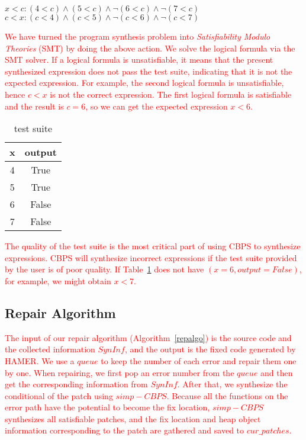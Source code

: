 \documentclass[a4paper,11pt,oneside,openany]{book}
\begin{document}
\begin{minipage}{\textwidth}
    \vspace{0.2cm}
    \textsl{\hspace{0.3cm}$x<c: (4<c)\wedge(5<c)\wedge\neg(6<c)\wedge\neg(7<c)$\\\hspace{0.3cm}$c<x: (c<4)\wedge(c<5)\wedge\neg(c<6)\wedge\neg(c<7)$\\}
\end{minipage}
\textcolor{red}{
We have turned the program synthesis problem into {\it Satisfiability Modulo Theories} (SMT) by doing the above action. We solve the logical formula via the SMT solver. If a logical formula is unsatisfiable, it means that the present synthesized expression does not pass the test suite, indicating that it is not the expected expression. For example, the second logical formula is unsatisfiable, hence $c<x$ is not the correct expression. The first logical formula is satisfiable and the result is $c=6$, so we can get the expected expression $x<6$.
}

\begin{table}[h]
  \caption{test suite}
  \label{test}
  \centering
  \begin{tabular}{|c|c|}
    \hline
     x & output \\
    \hline
     4 & True \\
     5 & True \\
     6 & False \\
     7 & False \\
    \hline
  \end{tabular}
\end{table}

\textcolor{red}{
The quality of the test suite is the most critical part of using CBPS to synthesize expressions. CBPS will synthesize incorrect expressions if the test suite provided by the user is of poor quality. If Table~\ref{test} does not have $(x=6, output=False)$, for example, we might obtain $x<7$.
}

\subsection{Repair Algorithm}
\textcolor{red}{
The input of our repair algorithm (Algorithm~\ref{repalgo}) is the source code and the collected information $SynInf$, and the output is the fixed code generated by HAMER. We use a $queue$ to keep the number of each error and repair them one by one. When repairing, we first pop an error number from the $queue$ and then get the corresponding information from $SynInf$. After that, we synthesize the conditional of the patch using $simp-CBPS$. Because all the functions on the error path have the potential to become the fix location, $simp-CBPS$ synthesizes all satisfiable patches, and the fix location and heap object information corresponding to the patch are gathered and saved to $cur\_patches$.
}
\end{document}

